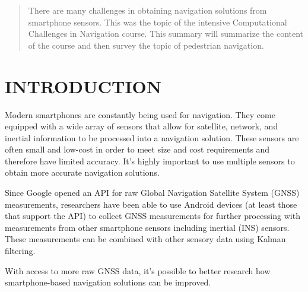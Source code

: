 \documentclass[twoside]{article}
\begin{document}
%

%


\begin{abstract}
\large
  There are many challenges in obtaining navigation solutions from smartphone sensors.
  This was the topic of the intensive Computational Challenges in Navigation course.
  This summary will summarize the content of the course and then survey the topic of
  pedestrian navigation.
\end{abstract}

\section{INTRODUCTION}
\large
Modern smartphones are constantly being used for navigation. They come equipped with
a wide array of sensors that allow for satellite, network, and inertial information
to be processed into a navigation solution. These sensors are often small and low-cost
in order to meet size and cost requirements and therefore have limited accuracy. It's
highly important to use multiple sensors to obtain more accurate navigation solutions.

Since Google opened an API for raw Global Navigation Satellite System (GNSS) measurements,
researchers have been able to use Android devices (at least those that support the API)
to collect GNSS measurements for further processing with measurements from other smartphone
sensors including inertial (INS) sensors. These measurements can be combined with other
sensory data using Kalman filtering.

With access to more raw GNSS data, it's possible to better research how smartphone-based
navigation solutions can be improved.
\end{document}
